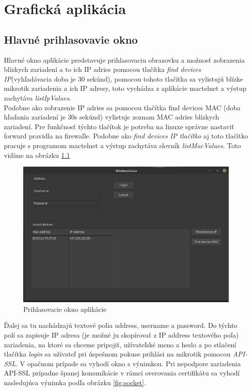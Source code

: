 \chapter{Grafická aplikácia}
\section{Hlavné prihlasovavie okno}
Hlavné okno aplikácie predstavuje prihlasovaciu obrazovku a možnosť zobrazenia blízkych zariadení a to ich IP adries pomocou tlačítka \textit{find devices IP}(vyhľadávacia doba je 30 sekúnd), pomocou tohoto tlačítka sa vylistujú blízke mikrotik zariadenia a ich IP adresy, toto vychádza z aplikácie mactelnet a výstup zachytáva \textit{listIpValues}.\\
Podobne ako zobrazenie IP adries sa pomocou tlačítka find devices MAC (doba hľadania zariadení je 30s sekúnd) vylistuje zoznam MAC adries blízkych zariadení. Pre funkčnosť týchto tlačítok je potreba na linuxe správne nastaviť forward pravidla na firewalle. Podobne ako \textit{find devices IP tlačítko} aj toto tlačítko pracuje s programom mactelnet a výstup zachytáva slovník \textit{listMacValues}. Toto vidíme na obrázku \ref{fig:winboxlinux}\\
\begin{figure}[H]
\centering
\includegraphics[scale=0.45]{../text/linuxwinbox.png}
\caption{Prihlasovacie okno aplikácie}
\label{fig:winboxlinux}
\end{figure}
Ďalej sa tu nachádzajú textové polia address, username a password. Do týchto polí sa zapisuje IP adresa (je možné ju skopírovať z IP address textového poľa) zariadenia, na ktoré sa chceme pripojiť, užívateľské meno  a heslo a po stlačení tlačítka \textit{login} sa užívateľ pri úspešnom pokuse prihlási na mikrotik pomocou \textit{API-SSL}. V opačnom prípade sa vyhodí okno s výnimkou. Pri nepodpore zariadenia API-SSL prípadne španej komunikácie v rámci overovania certifikátu sa vyhodí nasledujúca výnimka podľa obrázku \ref{fig:socket}.
